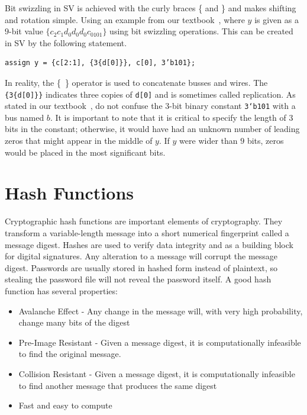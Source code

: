 \documentclass{article}
\begin{document}
Bit swizzling in SV is achieved with the curly braces \{ and \} and
makes shifting and rotation simple.
Using an example from our textbook~\cite{ddca-riscv}, where $y$ is
given as a $9$-bit value
$\{c_2c_1d_0d_0d_0c_0101\}$ using bit swizzling operations.  This can be
created in SV by the following statement.
\begin{verbatim}
assign y = {c[2:1], {3{d[0]}}, c[0], 3’b101};
\end{verbatim}
In reality, the \{~\} operator is used to concatenate busses and
wires.  The
\verb!{3{d[0]}}! indicates three copies of \verb!d[0]! and is
sometimes called replication.
As stated in our textbook~\cite{ddca-riscv}, do not confuse the
$3$-bit binary constant
\verb!3‘b101! with a bus named $b$.
It is important to note that it is critical to specify the length of
$3$ bits in the constant; otherwise, it would have had an unknown
number of leading zeros that might appear in the middle of $y$.
If $y$ were wider than $9$ bits, zeros would be placed in the most
significant bits.

\section{Hash Functions}

Cryptographic hash functions are important elements of
cryptography. They transform a variable-length message into a short
numerical fingerprint called a message digest. Hashes are used to
verify data integrity and as a building block for digital
signatures. Any alteration to a message will corrupt the message
digest. Passwords are usually stored in hashed form instead of
plaintext, so stealing the password file will not reveal the password
itself. A good hash function has several properties:
\begin{itemize}
\item Avalanche Effect - Any change in the message will, with very high probability, change 
  many bits of the digest
\item Pre-Image Resistant - Given a message digest, it is
  computationally infeasible to find the original message.
\item Collision Resistant - Given a message digest, it is
  computationally infeasible to find
  another message that produces the same digest
\item Fast and easy to compute
\end{itemize}
\end{document}
